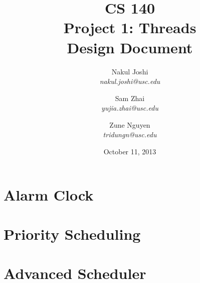 \documentclass[titlepage]{article}
\title{CS 140\\Project 1: Threads\\Design Document}
\author{
	Nakul Joshi\\ \textit{nakul.joshi@usc.edu}\and
	Sam Zhai\\ \textit{yujia.zhai@usc.edu}\and
	Zune Nguyen\\ \textit{tridungn@usc.edu}
	}
\date{October 11, 2013}
\begin{document}
\maketitle
\tableofcontents
\newpage

%	
\section{Alarm Clock}
	
	\newpage
\section{Priority Scheduling}
	
	\newpage
\section{Advanced Scheduler}
	
	\newpage
%	
\end{document}
